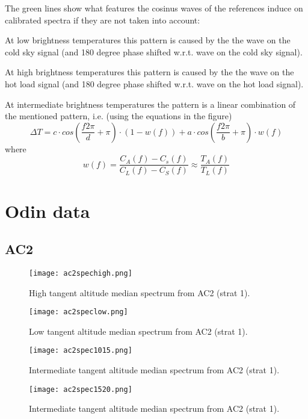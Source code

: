The green lines show what features the cosinus waves of the
references induce on calibrated spectra if they are not taken into account:

At low brightness temperatures this pattern is caused by the
the wave on the cold sky signal (and 180 degree phase shifted
w.r.t. wave on the cold sky signal).

At high brightness temperatures this pattern is caused by the
the wave on the hot load signal (and 180 degree phase shifted
w.r.t. wave on the hot load signal).

At intermediate brightness temperatures the pattern is a linear
combination of the mentioned pattern,
i.e. (using the equations in the figure) 
\begin{equation}
\Delta T=c \cdot cos\left(\frac{f2\pi}{d}+\pi\right) \cdot (1-w(f)) 
+a \cdot cos \left( \frac{f2\pi}{b}+\pi \right) \cdot w(f)
\end{equation}
where
\begin{equation}
w(f)=\frac{C_{A}(f)-C_{s}(f)}{C_{L}(f)-C_{S}(f)}\approx\frac{T_{A}(f)}{T_{L}(f)}
\end{equation}

\section{Odin data}
\subsection{AC2}
\begin{figure}[!t]
\centering
\texttt{[image: ac2spechigh.png]}\\
\caption{High tangent altitude median spectrum from AC2 (strat 1).}
\label{fig:study2spec1}
\end{figure}

\begin{figure}[!t]
\centering
\texttt{[image: ac2speclow.png]}\\
\caption{Low tangent altitude median spectrum from AC2 (strat 1).}
\label{fig:study2spec2}
\end{figure}

\begin{figure}[!t]
\centering
\texttt{[image: ac2spec1015.png]}\\
\caption{Intermediate tangent altitude median spectrum from AC2 (strat 1).}
\label{fig:study2spec3}
\end{figure}

\begin{figure}[!t]
\centering
\texttt{[image: ac2spec1520.png]}\\
\caption{Intermediate tangent altitude median spectrum from AC2 (strat 1).}
\label{fig:study2spec4}
\end{figure}

